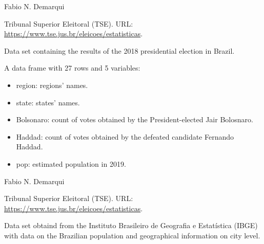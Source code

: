 \documentclass[letterpaper]{book}
\begin{document}
%
\begin{Author}\relax
Fabio N. Demarqui 
\end{Author}
%
\begin{Source}\relax
Tribunal Superior Eleitoral (TSE). URL:  \url{https://www.tse.jus.br/eleicoes/estatisticas}.
\end{Source}
%
\begin{Description}\relax
Data set containing the results of the 2018 presidential election in Brazil.
\end{Description}
%
\begin{Format}
A data frame with 27 rows and 5 variables:
\begin{itemize}

\item{} region: regions' names.
\item{} state: states' names.
\item{} Bolsonaro: count of votes obtained by the President-elected Jair Bolosnaro.
\item{} Haddad: count of votes obtained by the defeated candidate Fernando Haddad.
\item{} pop: estimated population in 2019.

\end{itemize}

\end{Format}
%
\begin{Author}\relax
Fabio N. Demarqui 
\end{Author}
%
\begin{Source}\relax
Tribunal Superior Eleitoral (TSE). URL:  \url{https://www.tse.jus.br/eleicoes/estatisticas}.
\end{Source}
%
\begin{Description}\relax
Data set obtaind from the Instituto Brasileiro de Geografia e Estatística (IBGE) with data on the Brazilian population and geographical information on city level.
\end{Description}
%
\end{document}
